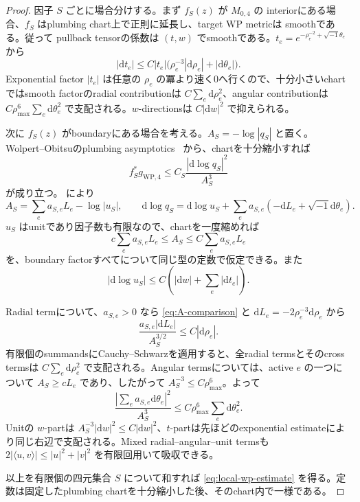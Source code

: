 \documentclass[11pt,a4paper]{ltjsarticle}
\newcommand{\dd}{\mathrm d}
\theoremstyle{plain}
\theoremstyle{definition}
\theoremstyle{remark}
\begin{document}
\begin{proof}
因子 $S$ ごとに場合分けする。まず $f_S(z)$ が $M_{0,4}$ の interiorにある場合、$f_S$ はplumbing chart上で正則に延長し、target WP metricは smoothである。従って pullback tensorの係数は $(t,w)$ でsmoothである。$t_e=e^{-\rho_e^{-2}+\sqrt{-1}\theta_e}$ から
\[
 |\dd t_e|
 \le C|t_e|\bigl(\rho_e^{-3}|\dd\rho_e|+|\dd\theta_e|\bigr).
\]
Exponential factor $|t_e|$ は任意の $\rho_e$ の冪より速く0へ行くので、十分小さいchartではsmooth factorのradial contributionは $C\sum_e\dd\rho_e^2$、angular contributionは $C\rho_{\max}^6\sum_e\dd\theta_e^2$ で支配される。$w$-directionsは $C|\dd w|^2$ で抑えられる。

次に $f_S(z)$ がboundaryにある場合を考える。$A_S=-\log|q_S|$ と置く。Wolpert--Obitsuのplumbing asymptotics~\cite{OW,WolpertCompletion} から、chartを十分縮小すれば
\begin{equation}
\label{eq:WP4-bound}
 f_S^*g_{\mathrm{WP},4}
 \le C_S\frac{|\dd\log q_S|^2}{A_S^3}
\end{equation}
が成り立つ。 により
\[
 A_S=\sum_ea_{S,e}L_e-\log|u_S|,
 \qquad
 \dd\log q_S=\dd\log u_S+
 \sum_ea_{S,e}(-\dd L_e+\sqrt{-1}\dd\theta_e).
\]
$u_S$ はunitであり因子数も有限なので、chartを一度縮めれば
\begin{equation}
\label{eq:A-comparison}
 c\sum_ea_{S,e}L_e
 \le A_S\le
 C\sum_ea_{S,e}L_e
\end{equation}
を、boundary factorすべてについて同じ型の定数で仮定できる。また
\[
 |\dd\log u_S|
 \le C\left(|\dd w|+\sum_e|\dd t_e|\right).
\]

Radial termについて、$a_{S,e}>0$ なら \eqref{eq:A-comparison} と $\dd L_e=-2\rho_e^{-3}\dd\rho_e$ から
\[
 \frac{a_{S,e}|\dd L_e|}{A_S^{3/2}}
 \le C|\dd\rho_e|.
\]
有限個のsummandsにCauchy--Schwarzを適用すると、全radial termsとそのcross termsは $C\sum_e\dd\rho_e^2$ で支配される。Angular termsについては、active $e$ の一つについて $A_S\ge cL_e$ であり、したがって $A_S^{-3}\le C\rho_{\max}^6$。よって
\[
 \frac{|\sum_ea_{S,e}\dd\theta_e|^2}{A_S^3}
 \le C\rho_{\max}^6\sum_e\dd\theta_e^2.
\]
Unitの $w$-partは $A_S^{-3}|\dd w|^2\le C|\dd w|^2$、$t$-partは先ほどのexponential estimateにより同じ右辺で支配される。Mixed radial--angular--unit termsも
$2|\langle u,v\rangle|\le |u|^2+|v|^2$ を有限回用いて吸収できる。

以上を有限個の四元集合 $S$ について和すれば \eqref{eq:local-wp-estimate} を得る。定数は固定したplumbing chartを十分縮小した後、そのchart内で一様である。
\end{proof}
\end{document}
